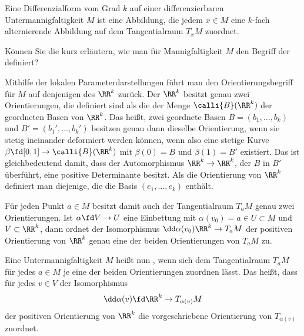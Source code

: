 \begin{antwort}
  Eine Differenzialform vom Grad $k$ auf einer differenzierbaren 
  Untermannigfaltigkeit $M$ ist eine Abbildung, die jedem 
  $x\in M$ eine $k$-fach alternierende Abbildung auf dem Tangentialraum 
  $T_xM$ zuordnet. \AntEnd
\end{antwort} 

\begin{frage}
  Können Sie die kurz erläutern, wie man für Mannigfaltigkeit 
  $M$ den Begriff der 
   definiert?
\end{frage}

\begin{antwort}
  Mithilfe der lokalen Parameterdarstellungen führt man den 
  Orientierungsbegriff für $M$ auf denjenigen des $\RR^k$ zurück. 
  Der $\RR^k$ besitzt genau zwei Orientierungen, die definiert sind 
  als die  der Menge $\calli{B}(\RR^k)$ 
  der geordneten Basen von $\RR^k$. Das heißt, zwei geordnete Basen 
  $B=(b_1,\ldots,b_k)$ und $B'=(b_1',\ldots,b_k')$ besitzen genau dann 
  dieselbe Orientierung, wenn sie stetig ineinander deformiert werden können, 
  wenn also eine stetige Kurve $\beta\fd [0,1] \to \calli{B}(\RR^k)$ 
  mit $\beta(0)=B$ und $\beta(1)=B'$ existiert. Das ist gleichbedeutend 
  damit, dass der Automorphismus $\RR^k \to \RR^k$, der $B$ in $B'$ überführt, 
  eine positive Determinante besitzt. Als die  Orientierung 
  von $\RR^k$ definiert man diejenige, die die Basis $(e_1,\ldots,e_k)$ 
  enthält. 

  Für jeden Punkt $a\in M$ besitzt damit auch der Tangentialraum 
  $T_a M$ genau zwei Orientierungen. 
  Ist $\alpha \fd V\to U$ eine Einbettung mit 
  $\alpha( v_0 ) = a\in U \subset M$ und $V\subset\RR^k$, 
  dann ordnet der Isomorphismus $\dd \alpha (v_0)  \RR^k \to T_a M$ 
  der positiven Orientierung von $\RR^k$ genau eine 
  der beiden Orientierungen von $T_a M$ zu. 

  Eine Untermannigfaltigkeit $M$ heißt nun 
  , wenn sich dem Tangentialraum 
  $T_a M$ für jedes $a\in M$ 
  je eine der beiden Orientierungen  
  zuordnen lässt. Das heißt, dass für jedes $v\in V$ 
  der Isomorphismus 
  \[
  \dd \alpha (v) \fd \RR^k \to T_{\alpha(v)} M 
  \]
  der positiven Orientierung von $\RR^k$ 
  die vorgeschriebene Orientierung 
  von $T_{\alpha(v)}$ zuordnet. 



\end{antwort}
